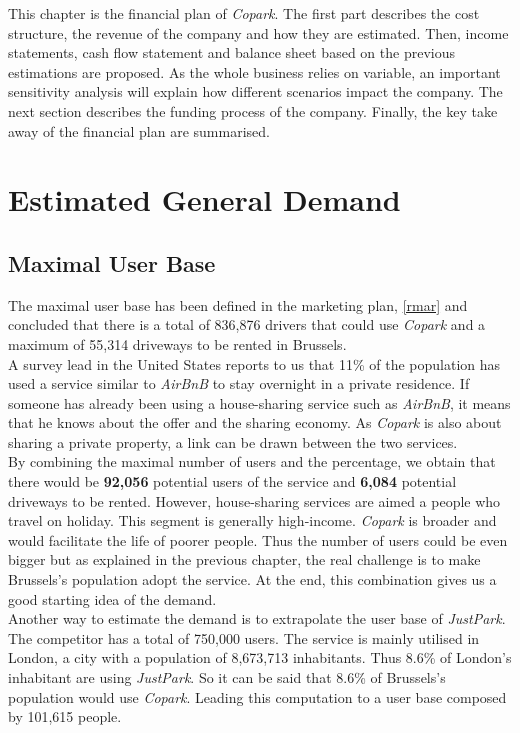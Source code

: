 \documentclass[12pt,a4paper,oneside]{book}
\newcommand{\bp}{\textit{Copark}}
\begin{document}
This chapter is the financial plan of \bp{}. The first part describes the cost structure, the revenue of the company and how they are estimated. Then, income statements, cash flow statement and balance sheet based on the previous estimations are proposed. As the whole business relies on variable, an important sensitivity analysis will explain how different scenarios impact the company. The next section describes the funding process of the company. Finally, the key take away of the financial plan are summarised.

\section{Estimated General Demand}

\subsection{Maximal User Base}

\label{mubsec}

The maximal user base has been defined in the marketing plan, \autoref{rmar} and concluded that there is a total of 836,876 drivers that could use \bp{} and a maximum of 55,314 driveways to be rented in Brussels.\\

A survey lead in the United States reports to us that 11\% of the population has used a service similar to \textit{AirBnB} to stay overnight in a private residence. If someone has already been using a house-sharing service such as \textit{AirBnB}, it means that he knows about the offer and the sharing economy. As \bp{} is also about sharing a private property, a link can be drawn between the two services.\\

By combining the maximal number of users and the percentage, we obtain that there would be \textbf{92,056} potential users of the service and \textbf{6,084} potential driveways to be rented. However, house-sharing services are aimed a people who travel on holiday. This segment is generally high-income. \bp{} is broader and would facilitate the life of poorer people. Thus the number of users could be even bigger but as explained in the previous chapter, the real challenge is to make Brussels's population adopt the service. At the end, this combination gives us a good starting idea of the demand.\\

Another way to estimate the demand is to extrapolate the user base of \textit{JustPark}. The competitor has a total of 750,000 users.\cite{jpu} The service is mainly utilised in London, a city with a population of 8,673,713 inhabitants.\cite{ciafb} Thus 8.6\% of London's inhabitant are using \textit{JustPark}. So it can be said that 8.6\% of Brussels's population would use \bp{}. Leading this computation to a user base composed by 101,615 people.\\
\end{document}

